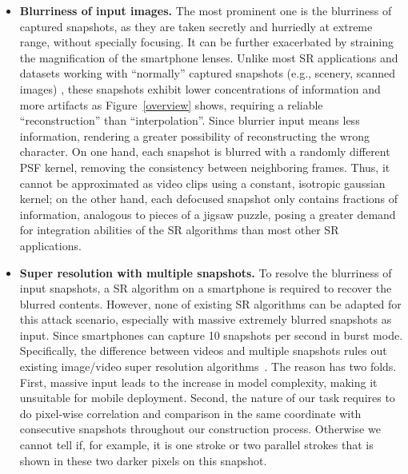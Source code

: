 \begin{itemize}[leftmargin=*]
  \item \textbf{Blurriness of input images.} The most prominent one is the blurriness of captured snapshots, as they are taken secretly and hurriedly at extreme range, without specially focusing. It can be further exacerbated by straining the magnification of the smartphone lenses. Unlike most SR applications and datasets working with ``normally'' captured snapshots (e.g., scenery, scanned images) \cite{nasrollahi2020deep,lyn2020image}, these snapshots exhibit lower concentrations of information and more artifacts as Figure~\ref{overview} shows, requiring a reliable ``reconstruction'' than ``interpolation''. Since blurrier input means less information, rendering a greater possibility of reconstructing the wrong character. 
  On one hand, each snapshot is blurred with a randomly different PSF kernel, removing the consistency between neighboring frames. Thus, it cannot be approximated as video clips using a constant, isotropic gaussian kernel; on the other hand, each defocused snapshot only contains fractions of information, analogous to pieces of a jigsaw puzzle, posing a greater demand for integration abilities of the SR algorithms than most other SR applications.
  \item \textbf{Super resolution with multiple snapshots.} To resolve the blurriness of input snapshots, a SR algorithm on a smartphone is required to recover the blurred contents. However, none of existing SR algorithms can be adapted for this attack scenario, especially with massive extremely blurred snapshots as input. Since smartphones can capture 10 snapshots per second in burst mode. Specifically, the difference between videos and multiple snapshots rules out existing image/video super resolution algorithms~\cite{lucas2019generative,kappeler2016video}. The reason has two folds. First, massive input leads to the increase in model complexity, making it unsuitable for mobile deployment. Second, the nature of our task requires to do pixel-wise correlation and comparison in the same coordinate with consecutive snapshots throughout our construction process. Otherwise we cannot tell if, for example, it is one stroke or two parallel strokes that is shown in these two darker pixels on this snapshot.

\end{itemize}
